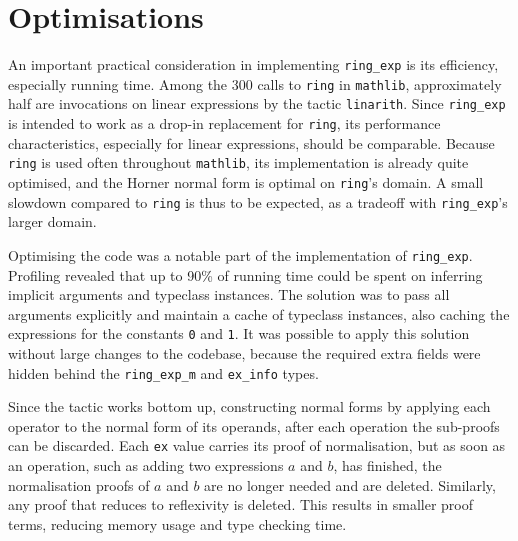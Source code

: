 \documentclass{llncs}
\newcommand{\lean}[1]{\texttt{#1}\xspace} %
\newcommand{\mathlib}{\texttt{mathlib}\xspace}
\newcommand{\ring}{\lean{ring}}
\newcommand{\ringexp}{\lean{ring\_exp}}
\begin{document}
\section{Optimisations}

An important practical consideration in implementing \ringexp is its efficiency, especially running time.
Among the 300 calls to \ring in \mathlib, approximately half are invocations on linear expressions by the tactic \lean{linarith}.
Since \ringexp is intended to work as a drop-in replacement for \lean{ring},
its performance characteristics, especially for linear expressions, should be comparable.
Because \ring is used often throughout \mathlib, its implementation is already quite optimised,
and the Horner normal form is optimal on \ring's domain.
A small slowdown compared to \ring is thus to be expected, as a tradeoff with \ringexp's larger domain.

Optimising the code was a notable part of the implementation of \ringexp.
Profiling revealed that up to 90\% of running time could be spent on inferring implicit arguments and typeclass instances.
The solution was to pass all arguments explicitly and maintain a cache of typeclass instances,
also caching the expressions for the constants \lean{0} and \lean{1}.
It was possible to apply this solution without large changes to the codebase,
because the required extra fields were hidden behind the \lean{ring\_exp\_m} and \lean{ex\_info} types.

Since the tactic works bottom up,
constructing normal forms by applying each operator to the normal form of its operands,
after each operation the sub-proofs can be discarded.
Each \lean{ex} value carries its proof of normalisation,
but as soon as an operation, such as adding two expressions $a$ and $b$, has finished,
the normalisation proofs of $a$ and $b$ are no longer needed and are deleted.
Similarly, any proof that reduces to reflexivity is deleted.
This results in smaller proof terms, reducing memory usage and type checking time.

\end{document}

